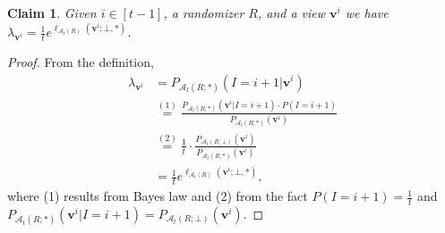 \documentclass{article}
\theoremstyle{plain}
\newtheorem{claim}[theorem]{Claim}
\theoremstyle{definition}
\newcommand{\eqExp}[2]{\overset{(#1)}{#2}}
\newcommand{\rand}{R}
\newcommand{\view}{\boldsymbol{v}}
\newcommand{\lossAlg}[4]{\ell_{#1}\left(#2; #3, #4 \right)}
\newcommand{\alloc}[2]{\mathcal{A}_{#1}\left(#2\right)}
\newcommand{\allocFunc}[3]{\mathcal{A}_{#1}\left(#2; #3\right)}
\begin{document}
\begin{claim}\label{clm:postProbEqLoss}
    Given $i \in [t-1]$, a randomizer $\rand$, and a view $\view^{i}$ we have $\lambda_{\view^{i}} = \frac{1}{t} e^{\lossAlg{\alloc{t}{\rand}}{\view^{i}}{\bot}{*}}$.
\end{claim}
\begin{proof}
    From the definition,
    \begin{align*}
        \lambda_{\view^{i}} & = P_{\allocFunc{t}{\rand}{*}} \left(I = i+1 \vert \view^{i} \right)
        \\ & \eqExp{1}{=} \frac{P_{\allocFunc{t}{\rand}{*}} \left(\view^{i} \vert I = i+1 \right) \cdot P\left(I = i+1 \right)}{P_{\allocFunc{t}{\rand}{*}} \left(\view^{i} \right)}
        \\ & \eqExp{2}{=} \frac{1}{t} \cdot \frac{P_{\allocFunc{t}{\rand}{\bot}} \left(\view^{i} \right)}{P_{\allocFunc{t}{\rand}{*}} \left(\view^{i} \right)}
        \\ & = \frac{1}{t} e^{\lossAlg{\alloc{t}{\rand}}{\view^{i}}{\bot}{*}},
    \end{align*}
    where (1) results from Bayes law and (2) from the fact $P\left(I = i+1 \right) = \frac{1}{t}$ and $P_{\allocFunc{t}{\rand}{*}} \left(\view^{i} \vert I = i+1 \right) = P_{\allocFunc{t}{\rand}{\bot}} \left(\view^{i} \right)$.
\end{proof}
\end{document}
